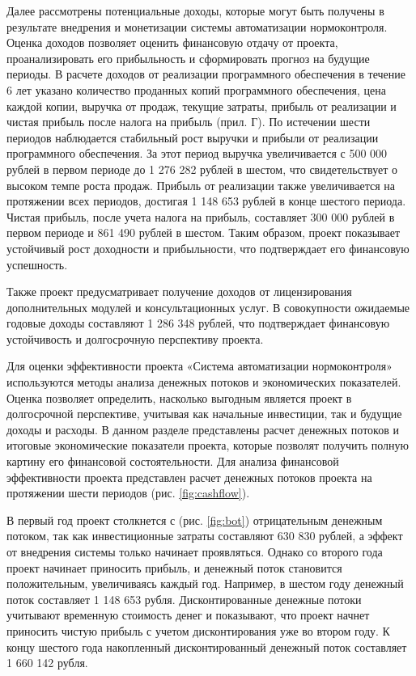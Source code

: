 \documentclass{report}
\begin{document}
Далее рассмотрены потенциальные доходы, которые могут быть получены в результате внедрения и монетизации системы автоматизации нормоконтроля. Оценка доходов позволяет оценить финансовую отдачу от проекта, проанализировать его прибыльность и сформировать прогноз на будущие периоды. 
В расчете доходов от реализации программного обеспечения в течение 6 лет указано количество проданных копий программного обеспечения, цена каждой копии, выручка от продаж, текущие затраты, прибыль от реализации и чистая прибыль после налога на прибыль (прил. Г). По истечении шести периодов наблюдается стабильный рост выручки и прибыли от реализации программного обеспечения. За этот период выручка увеличивается с 500 000 рублей в первом периоде до 1 276 282 рублей в шестом, что свидетельствует о высоком темпе роста продаж. Прибыль от реализации также увеличивается на протяжении всех периодов, достигая 1 148 653 рублей в конце шестого периода. Чистая прибыль, после учета налога на прибыль, составляет 300 000 рублей в первом периоде и 861 490 рублей в шестом. Таким образом, проект показывает устойчивый рост доходности и прибыльности, что подтверждает его финансовую успешность.

Также проект предусматривает получение доходов от лицензирования дополнительных модулей и консультационных услуг. В совокупности ожидаемые годовые доходы составляют 1 286 348 рублей, что подтверждает финансовую устойчивость и долгосрочную перспективу проекта.

Для оценки эффективности проекта «Система автоматизации нормоконтроля» используются методы анализа денежных потоков и экономических показателей. Оценка позволяет определить, насколько выгодным является проект в долгосрочной перспективе, учитывая как начальные инвестиции, так и будущие доходы и расходы. В данном разделе представлены расчет денежных потоков и итоговые экономические показатели проекта, которые позволят получить полную картину его финансовой состоятельности.
Для анализа финансовой эффективности проекта представлен расчет денежных потоков проекта на протяжении шести периодов (рис. \ref{fig:cashflow}). 


В первый год проект столкнется с (рис. \ref{fig:bot}) отрицательным денежным потоком, так как инвестиционные затраты составляют 630 830 рублей, а эффект от внедрения системы только начинает проявляться. Однако со второго года проект начинает приносить прибыль, и денежный поток становится положительным, увеличиваясь каждый год. Например, в шестом году денежный поток составляет 1 148 653 рубля. Дисконтированные денежные потоки учитывают временную стоимость денег и показывают, что проект начнет приносить чистую прибыль с учетом дисконтирования уже во втором году. К концу шестого года накопленный дисконтированный денежный поток составляет 1 660 142 рубля.
\end{document}
